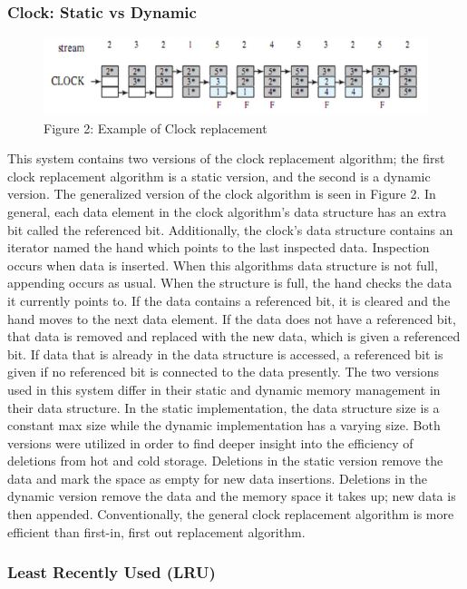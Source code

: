 \documentclass[12pt]{article}
\begin{document}
\subsubsection{Clock: Static vs Dynamic}
   
\begin{figure}[h]
\centering
\includegraphics[width=\columnwidth]{Clock}
\caption{Figure 2: Example of Clock replacement \cite{10}}
\end{figure}

This system contains two versions of the clock replacement algorithm; the first clock replacement algorithm is a static version, and the second is a dynamic version. The generalized version of the clock algorithm is seen in Figure 2. In general, each data element in the clock algorithm’s data structure has an extra bit called the referenced bit. Additionally, the clock’s data structure contains an iterator named the hand which points to the last inspected data. Inspection occurs when data is inserted. When this algorithms data structure is not full, appending occurs as usual. When the structure is full, the hand checks the data it currently points to. If the data contains a referenced bit, it is cleared and the hand moves to the next data element. If the data does not have a referenced bit, that data is removed and replaced with the new data, which is given a referenced bit. If data that is already in the data structure is accessed, a referenced bit is given if no referenced bit is connected to the data presently.
        The two versions used in this system differ in their static and dynamic memory management in their data structure. In the static implementation, the data structure size is a constant max size while the dynamic implementation has a varying size. Both versions were utilized in order to find deeper insight into the efficiency of deletions from hot and cold storage. Deletions in the static version remove the data and mark the space as empty for new data insertions. Deletions in the dynamic version remove the data and the memory space it takes up; new data is then appended. Conventionally, the general clock replacement algorithm is more efficient than first-in, first out replacement algorithm.

\subsubsection{Least Recently Used (LRU)}
   
\end{document}
